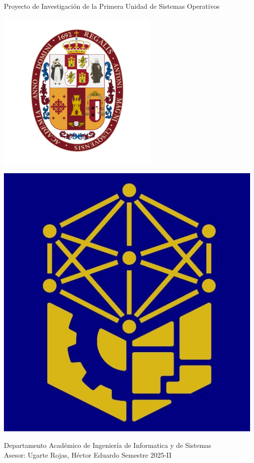 \documentclass[letterpaper,12pt]{report}
\begin{document}
    {Proyecto de Investigación de la Primera Unidad de Sistemas Operativos \\
    \begin{minipage}{0.45\textwidth}
        \centering
        \includegraphics[width=0.8\linewidth]{figures/UNSAAC.png}
    \end{minipage}%
    \hfill
    \begin{minipage}{0.45\textwidth}
        \centering
        \includegraphics[width=0.8\linewidth]{figures/INGINFO.jpg}
    \end{minipage}
    }
    {Departamento Académico de Ingeniería de Informatica y de Sistemas \\ 
     Asesor: Ugarte Rojas, Héctor Eduardo}
    {Semestre 2025-II}

\clearpage
{}   

\clearpage
{}   

\end{document}
